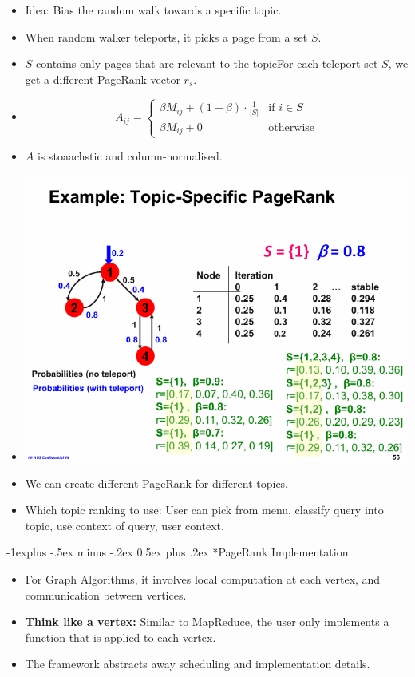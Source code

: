 \documentclass[10pt, landscape]{article}
\makeatletter
\renewcommand{\subsection}{\@startsection{subsection}{2}{0mm}%
  {-1explus -.5ex minus -.2ex}%
  {0.5ex plus .2ex}%
{\normalfont\normalsize\bfseries}}
\makeatother
\begin{document}
\begin{multicols*}{4}
    \begin{itemize}
      \item Idea: Bias the random walk towards a specific topic.
      \item When random walker teleports, it picks a page from a set $S$.
      \item $S$ contains only pages that are relevant to the topicFor each teleport set $S$, we get a different PageRank vector $r_s$.
      \item \begin{equation*}
        A_{ij} =
        \begin{cases}
          \beta M_{ij} + (1 - \beta) \cdot \frac{1}{|S|} &\text{if } i \in S\\
          \beta M_{ij} + 0  &\text{otherwise}
        \end{cases}
      \end{equation*}
       \item $A$ is stoaachstic and column-normalised.
       \item \includegraphics*[width=0.95\linewidth]{topic_specific_variables.png}
       \item We can create different PageRank for different topics.
       \item Which topic ranking to use: User can pick from menu, classify query into topic, use context of query, user context.
    \end{itemize}

    \subsection*{PageRank Implementation}
    \begin{itemize}
      \item For Graph Algorithms, it involves local computation at each vertex, and communication between vertices.
      \item \textbf{Think like a vertex:} Similar to MapReduce, the user only implements a function that is applied to each vertex.
      \item The framework abstracts away scheduling and implementation details.
    \end{itemize}


\end{multicols*}
\end{document}

